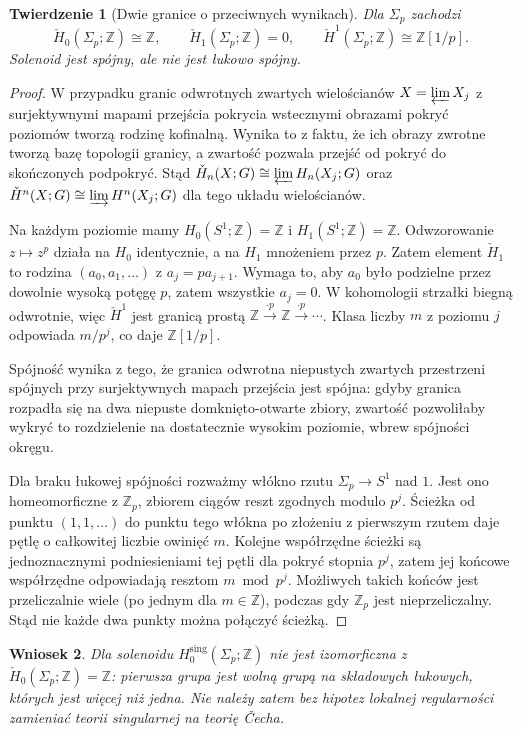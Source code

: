 \documentclass[11pt,a4paper,oneside]{report}
\newcommand{\Z}{\mathbb{Z}}
\theoremstyle{plain}
\newtheorem{twierdzenie}{Twierdzenie}[section]
\newtheorem{wniosek}[twierdzenie]{Wniosek}
\theoremstyle{definition}
\theoremstyle{remark}
\begin{document}
\begin{twierdzenie}[Dwie granice o przeciwnych wynikach]
\label{thm:solenoid-v4}
Dla $\Sigma_p$ zachodzi
\[
\check H_0(\Sigma_p;\Z)\cong\Z,\qquad
\check H_1(\Sigma_p;\Z)=0,\qquad
\check H^{1}(\Sigma_p;\Z)\cong\Z[1/p].
\]
Solenoid jest spójny, ale nie jest łukowo spójny.
\end{twierdzenie}
\begin{proof}
W przypadku granic odwrotnych zwartych wielościanów
$X=\varprojlim X_j$ z surjektywnymi mapami przejścia
pokrycia wstecznymi obrazami pokryć poziomów tworzą
rodzinę kofinalną. Wynika to z faktu, że ich obrazy zwrotne
tworzą bazę topologii granicy, a zwartość pozwala przejść
od pokryć do skończonych podpokryć. Stąd
$\check H_n(X;G)\cong\varprojlim H_n(X_j;G)$ oraz
$\check H^n(X;G)\cong\varinjlim H^n(X_j;G)$
dla tego układu wielościanów.

Na każdym poziomie mamy $H_0(S^1;\Z)=\Z$ i
$H_1(S^1;\Z)=\Z$. Odwzorowanie $z\mapsto z^p$ działa
na $H_0$ identycznie, a na $H_1$ mnożeniem przez $p$.
Zatem element $\check H_1$ to rodzina
$(a_0,a_1,\ldots)$ z $a_j=pa_{j+1}$.
Wymaga to, aby $a_0$ było podzielne przez dowolnie
wysoką potęgę $p$, zatem wszystkie $a_j=0$.
W kohomologii strzałki biegną odwrotnie, więc
$\check H^1$ jest granicą prostą
$\Z\xrightarrow{\cdot p}\Z\xrightarrow{\cdot p}\cdots$.
Klasa liczby $m$ z poziomu $j$ odpowiada $m/p^j$,
co daje $\Z[1/p]$.

Spójność wynika z tego, że granica odwrotna niepustych
zwartych przestrzeni spójnych przy surjektywnych mapach
przejścia jest spójna: gdyby granica rozpadła się na dwa
niepuste domknięto-otwarte zbiory, zwartość pozwoliłaby
wykryć to rozdzielenie na dostatecznie wysokim poziomie,
wbrew spójności okręgu.

Dla braku łukowej spójności rozważmy włókno rzutu
$\Sigma_p\to S^1$ nad $1$. Jest ono homeomorficzne z
$\Z_p$, zbiorem ciągów reszt zgodnych modulo $p^j$.
Ścieżka od punktu $(1,1,\ldots)$ do punktu tego włókna
po złożeniu z pierwszym rzutem daje pętlę o całkowitej
liczbie owinięć $m$. Kolejne współrzędne ścieżki są
jednoznacznymi podniesieniami tej pętli dla pokryć stopnia
$p^j$, zatem jej końcowe współrzędne odpowiadają resztom
$m\bmod p^j$. Możliwych takich końców jest przeliczalnie
wiele (po jednym dla $m\in\Z$), podczas gdy $\Z_p$ jest
nieprzeliczalny. Stąd nie każde dwa punkty można połączyć
ścieżką.
\end{proof}

\begin{wniosek}
Dla solenoidu $H_0^{\mathrm{sing}}(\Sigma_p;\Z)$ nie jest
izomorficzna z $\check H_0(\Sigma_p;\Z)=\Z$:
pierwsza grupa jest wolną grupą na składowych łukowych,
których jest więcej niż jedna. Nie należy zatem bez
hipotez lokalnej regularności zamieniać teorii singularnej
na teorię \v{C}echa.
\end{wniosek}
\end{document}
